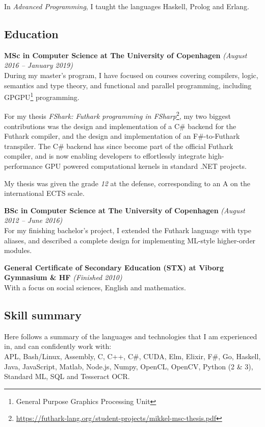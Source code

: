 \documentclass[10pt, a4paper]{article}
\begin{document}
  In \textit{Advanced Programming}, I taught the languages Haskell, Prolog and
  Erlang.

\subsection*{Education}
\textbf{MSc in Computer Science at The University of Copenhagen} \textit{(August 2016 -- January 2019)}\\
  During my master's program, I have focused on courses covering compilers,
  logic, semantics and type theory, and functional and parallel programming,
  including GPGPU\footnote{General Purpose Graphics Processing Unit} programming.

  For my thesis \textit{FShark: Futhark programming in
    FSharp}\footnote{\url{https://futhark-lang.org/student-projects/mikkel-msc-thesis.pdf}},
  my two biggest contributions was the design and implementation of a C\# backend for
  the Futhark compiler, and the design and implementation of an F\#-to-Futhark transpiler.
  The C\# backend has since become part of the official Futhark compiler, and is
  now enabling developers to effortlessly integrate high-performance GPU powered
  computational kernels in standard .NET projects.

  My thesis was given the grade \textit{12} at the defense, corresponding to
  an A on the international ECTS scale.
  
\textbf{BSc in Computer Science at The University of Copenhagen} \textit{(August 2012 -- June 2016)}\\
  For my finishing bachelor's project, I extended the Futhark language with type
  aliases, and described a complete design for implementing ML-style higher-order modules.

\textbf{General Certificate of Secondary Education (STX) at Viborg Gymnasium \& HF} \textit{(Finished 2010)}\\
  With a focus on social sciences, English and mathematics.

\subsection*{Skill summary}
Here follows a summary of the languages and technologies that I am experienced in,
and can confidently work with:\\
APL, Bash/Linux, Assembly, C, C++, C\#, CUDA, Elm, Elixir, F\#, Go, Haskell,
Java, JavaScript, Matlab, Node.js, Numpy, OpenCL, OpenCV, Python (2 \& 3),
Standard ML, SQL and Tesseract OCR.
\end{document}
